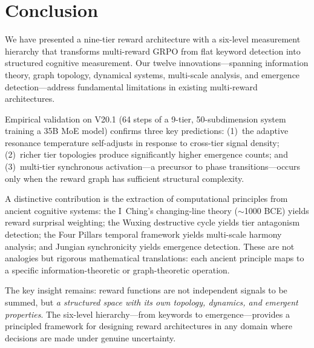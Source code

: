 \documentclass{article}
\begin{document}
\section{Conclusion}

We have presented a nine-tier reward architecture with a six-level measurement hierarchy that transforms multi-reward GRPO from flat keyword detection into structured cognitive measurement. Our twelve innovations---spanning information theory, graph topology, dynamical systems, multi-scale analysis, and emergence detection---address fundamental limitations in existing multi-reward architectures.

Empirical validation on V20.1 (64 steps of a 9-tier, 50-subdimension system training a 35B MoE model) confirms three key predictions: (1)~the adaptive resonance temperature self-adjusts in response to cross-tier signal density; (2)~richer tier topologies produce significantly higher emergence counts; and (3)~multi-tier synchronous activation---a precursor to phase transitions---occurs only when the reward graph has sufficient structural complexity.

A distinctive contribution is the extraction of computational principles from ancient cognitive systems: the I~Ching's changing-line theory ($\sim$1000 BCE) yields reward surprisal weighting; the Wuxing destructive cycle yields tier antagonism detection; the Four Pillars temporal framework yields multi-scale harmony analysis; and Jungian synchronicity yields emergence detection. These are not analogies but rigorous mathematical translations: each ancient principle maps to a specific information-theoretic or graph-theoretic operation.

The key insight remains: reward functions are not independent signals to be summed, but \emph{a structured space with its own topology, dynamics, and emergent properties}. The six-level hierarchy---from keywords to emergence---provides a principled framework for designing reward architectures in any domain where decisions are made under genuine uncertainty.


\end{document}
